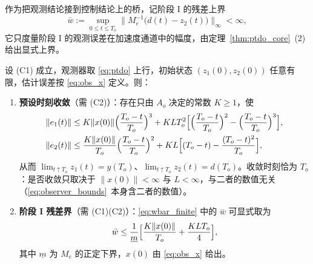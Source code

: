 作为把观测结论接到控制结论上的桥，记阶段 I 的残差上界
\begin{equation}
\bar w:=\sup_{0\le t\le T_o}\bigl\lVert M_e^{-1}\bigl(d(t)-z_2(t)\bigr)\bigr\rVert_\infty<\infty ,
\label{eq:wbar_finite}
\end{equation}
它只度量阶段 I 的观测误差在加速度通道中的幅度，由定理~\ref{thm:ptdo_core}~(2) 给出显式上界。

\begin{theorem}[阶段 I：预设时间观测器]\label{thm:obs1}%
\label{thm:ptdo_core}\label{thm:ptdo}
设 \textup{(C1)} 成立，观测器取 \eqref{eq:ptdo} 上行，初始状态 \((z_1(0),z_2(0))\) 任意有限，估计误差按 \eqref{eq:obs_x} 定义。则：
\begin{enumerate}
  \item[\textup{(1)}] \textbf{预设时刻收敛}（需 \textup{(C2)}）：存在只由 \(A_o\) 决定的常数 \(K\ge1\)，使
\begin{equation}
\begin{aligned}
\|e_1(t)\|&\le K\|x(0)\|\Bigl(\frac{T_o-t}{T_o}\Bigr)^{3}
+KLT_o^{2}\Bigl[\Bigl(\frac{T_o-t}{T_o}\Bigr)^{2}-\Bigl(\frac{T_o-t}{T_o}\Bigr)^{3}\Bigr],\\
\|e_2(t)\|&\le\frac{K\|x(0)\|}{T_o}\Bigl(\frac{T_o-t}{T_o}\Bigr)^{2}
+KL\Bigl[(T_o-t)-\frac{(T_o-t)^{2}}{T_o}\Bigr],
\end{aligned}
\label{eq:observer_bounds}
\end{equation}
从而 \(\lim_{t\uparrow T_o}z_1(t)=y(T_o)\)、\(\lim_{t\uparrow T_o}z_2(t)=d(T_o)\)。收敛时刻恰为 \(T_o\)：是否收敛只取决于 \(\lVert x(0)\rVert<\infty\) 与 \(L<\infty\)，与二者的数值无关（\eqref{eq:observer_bounds}~本身含二者的数值）。
  \item[\textup{(2)}] \textbf{阶段 I 残差界}（需 \textup{(C1)(C2)}）：\eqref{eq:wbar_finite} 中的 \(\bar w\) 可显式取为
\begin{equation}
\bar w\le\frac{1}{\underline m}\Bigl[\frac{K\|x(0)\|}{T_o}+\frac{KLT_o}{4}\Bigr],
\label{eq:residual_bound}
\end{equation}
其中 \(\underline m\) 为 \(M_e\) 的正定下界，\(x(0)\) 由 \eqref{eq:obs_x} 给出。
\end{enumerate}
\end{theorem}


